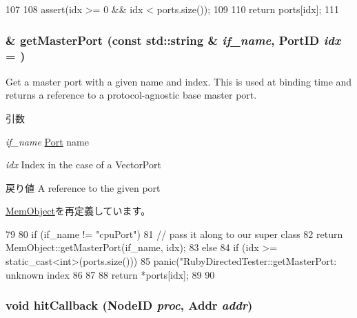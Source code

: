 \begin{DoxyCode}
107 {
108     assert(idx >= 0 && idx < ports.size());
109 
110     return ports[idx];
111 }
\end{DoxyCode}
\hypertarget{classRubyDirectedTester_adc4e675e51defbdd1e354dac729d0703}{
\subsubsection[{getMasterPort}]{ \& getMasterPort (const std::string \& {\em if\_\-name}, \/  {\bf PortID} {\em idx} = {})}}
\label{classRubyDirectedTester_adc4e675e51defbdd1e354dac729d0703}
Get a master port with a given name and index. This is used at binding time and returns a reference to a protocol-\/agnostic base master port.


\begin{DoxyParams}{引数}
\item[{\em if\_\-name}]\hyperlink{classPort}{Port} name \item[{\em idx}]Index in the case of a VectorPort\end{DoxyParams}
\begin{DoxyReturn}{戻り値}
A reference to the given port 
\end{DoxyReturn}


\hyperlink{classMemObject_adc4e675e51defbdd1e354dac729d0703}{MemObject}を再定義しています。


\begin{DoxyCode}
79 {
80     if (if_name != "cpuPort") {
81         // pass it along to our super class
82         return MemObject::getMasterPort(if_name, idx);
83     } else {
84         if (idx >= static_cast<int>(ports.size())) {
85             panic("RubyDirectedTester::getMasterPort: unknown index %
86         }
87 
88         return *ports[idx];
89     }
90 }
\end{DoxyCode}
\hypertarget{classRubyDirectedTester_a875ac440c302467e1c727800d0dc2c3c}{
\subsubsection[{hitCallback}]{\setlength{\rightskip}{0pt plus 5cm}void hitCallback ({\bf NodeID} {\em proc}, \/  {\bf Addr} {\em addr})}}
\label{classRubyDirectedTester_a875ac440c302467e1c727800d0dc2c3c}



